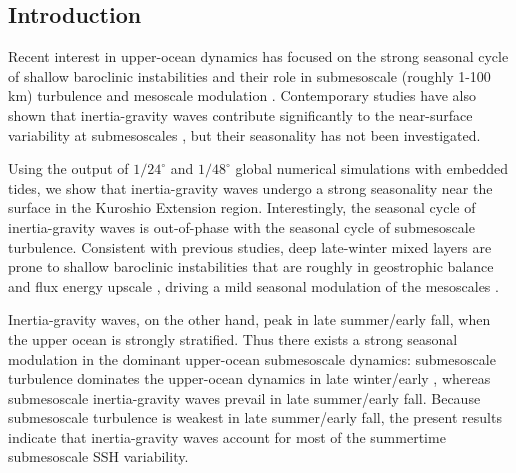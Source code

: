 \documentclass[grl]{agutex2015}
\begin{document}
\begin{article}

%
%

\section{Introduction}

Recent interest in upper-ocean dynamics has focused on the strong seasonal
cycle of shallow baroclinic instabilities and their role in submesoscale (roughly 1-100 km)
turbulence and mesoscale modulation \citep{sasaki_etal2014,qiu_etal2014,
callies_etal2015, thompson_etal2016,buckingham_etal2016}. Contemporary studies
have also shown that inertia-gravity waves contribute significantly
to the near-surface variability at submesoscales \citep{richman_etal2012,
buhler_etal2014,rocha_etal2016}, but their seasonality has not been investigated.

Using the output of $1/24^\circ$ and $1/48^\circ$ global
numerical simulations with embedded tides, we show that inertia-gravity waves undergo
a strong seasonality near the surface in the Kuroshio Extension region.
Interestingly, the seasonal cycle of inertia-gravity waves is out-of-phase
with the seasonal cycle of submesoscale turbulence. Consistent with previous studies,
deep late-winter mixed layers are prone to
shallow baroclinic instabilities that are roughly in geostrophic balance
and flux energy upscale \citep{sasaki_etal2014,callies_etal2016},
driving a mild seasonal modulation of the mesoscales \citep{sasaki_etal2014,qiu_etal2014}.

Inertia-gravity waves, on the other hand, peak in late summer/early fall,
when the upper ocean is strongly stratified. Thus there exists a
strong seasonal modulation in the dominant upper-ocean submesoscale dynamics:
submesoscale turbulence dominates the upper-ocean dynamics in late winter/early ,
whereas submesoscale inertia-gravity waves prevail in late summer/early fall.
Because submesoscale turbulence is weakest in late summer/early fall,
the present results indicate that inertia-gravity waves account for most of the
summertime submesoscale SSH variability.


\end{article}
\end{document}
